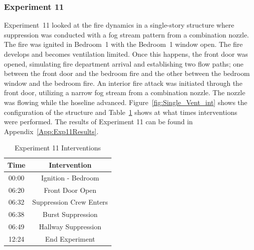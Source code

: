 \documentclass[12pt,oneside]{book}
\begin{document}
\subsubsection{Experiment 11}
Experiment~11 looked at the fire dynamics in a single-story structure where suppression was conducted with a fog stream pattern from a combination nozzle. The fire was ignited in Bedroom~1 with the Bedroom~1 window open. The fire develops and becomes ventilation limited. Once this happens, the front door was opened, simulating fire department arrival and establishing two flow paths; one between the front door and the bedroom fire and the other between the bedroom window and the bedroom fire. An interior fire attack was initiated through the front door, utilizing a narrow fog stream from a combination nozzle. The nozzle was flowing while the hoseline advanced.  Figure~\ref{fig:Single_Vent_int} shows the configuration of the structure and Table~\ref{Table:Exp11Interventions} shows at what times interventions were performed. The results of Experiment 11 can be found in Appendix~\ref{App:Exp11Results}. 


\begin{table}[H]
	\centering
	\caption{Experiment 11 Interventions}
	\begin{tabular}{|c|c|} 
		\hline
		Time & Intervention \\ \hline \hline
		00:00 & Ignition - Bedroom \\ \hline
		06:20 & Front Door Open \\ \hline
		06:32 & Suppression Crew Enters\\ \hline
		06:38 & Burst Suppression \\ \hline 
		06:49 & Hallway Suppression \\ \hline
		12:24 & End Experiment\\ \hline
	\end{tabular}
	\label{Table:Exp11Interventions}
\end{table}

\FloatBarrier
\end{document}
